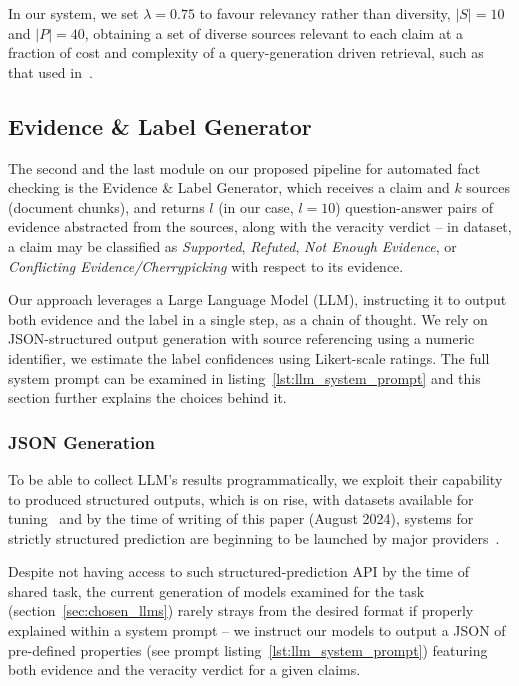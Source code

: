 In our system, we set $\lambda=0.75$ to favour relevancy rather than diversity, $|S|=10$ and $|P| = 40$, obtaining a set of diverse sources relevant to each claim at a fraction of cost and complexity of a query-generation driven retrieval, such as that used in~\cite{averitec2024}.

\subsection{Evidence \& Label Generator}
\label{sec:generation}
The second and the last module on our proposed pipeline for automated fact checking is the Evidence \& Label Generator, which receives a claim and $k$ sources (document chunks), and returns $l$ (in our case, $l=10$) question-answer pairs of evidence abstracted from the sources, along with the veracity verdict -- in \averitec{} dataset, a claim may be classified as \textit{Supported}, \textit{Refuted}, \textit{Not Enough Evidence}, or \textit{Conflicting Evidence/Cherrypicking} with respect to its evidence.

Our approach leverages a Large Language Model (LLM), instructing it to output both evidence and the label in a single step, as a chain of thought.
We rely on JSON-structured output generation with source referencing using a numeric identifier, we estimate the label confidences using Likert-scale ratings.
The full system prompt can be examined in listing~\ref{lst:llm_system_prompt} and this section further explains the choices behind it.

\subsubsection{JSON Generation}

To be able to collect LLM's results programmatically, we exploit their capability to produced structured outputs, which is on rise, with datasets available for tuning~\cite{tang2024strucbenchlargelanguagemodels} and by the time of writing of this paper (August 2024), systems for strictly structured prediction are beginning to be launched by major providers~\cite{json}.

Despite not having access to such structured-prediction API by the time of \averitec{} shared task, the current generation of models examined for the task (section~\ref{sec:chosen_llms}) rarely strays from the desired format if properly explained within a system prompt -- we instruct our models to output a JSON of pre-defined properties (see prompt listing~\ref{lst:llm_system_prompt}) featuring both evidence and the veracity verdict for a given claims.

